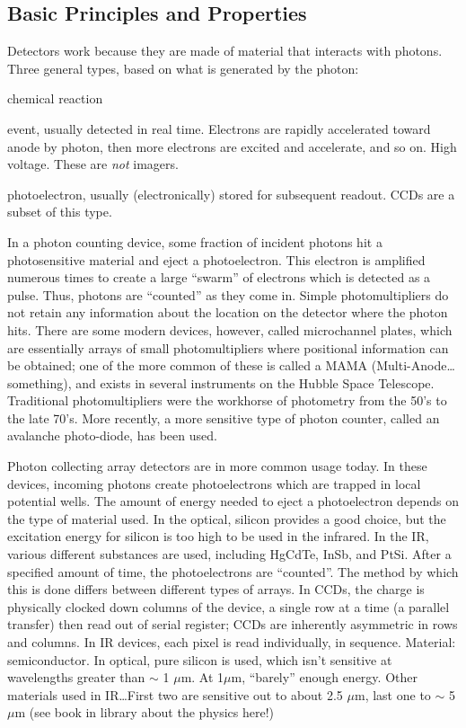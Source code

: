\documentclass[12pt]{article}
\begin{document}
\subsection{Basic Principles and Properties}
Detectors work because they are made of material that interacts with photons.
Three general types, based on what is generated by the photon:
\begin{description}[labelwidth=10em, leftmargin=12em]
    \item [Photographic detector] chemical reaction
    \item [Photomultiplier/photon counter] event, usually detected
        in real time. Electrons are rapidly accelerated toward anode
        by photon, then more electrons are excited and accelerate, and
        so on. High voltage. These are \emph{not} imagers.
    \item [Photon collecter] photoelectron, usually (electronically)
        stored for subsequent readout. CCDs are a subset of this type.
\end{description}

In a photon counting device, some fraction of incident photons hit a
photosensitive material and eject a photoelectron. This electron is
amplified numerous times to create a large ``swarm'' of electrons
which is detected as a pulse. Thus, photons are ``counted'' as they
come in. Simple photomultipliers do not retain any information about
the location on the detector where the photon hits. There are some
modern devices, however, called microchannel plates, which are
essentially arrays of small photomultipliers where positional
information can be obtained; one of the more common of these is called
a MAMA (Multi-Anode\ldots something),
and exists in several instruments on the Hubble Space
Telescope. Traditional photomultipliers were the workhorse of
photometry from the 50's to the late 70's. More recently, a more
sensitive type of photon counter, called an avalanche photo-diode, has
been used.

Photon collecting array detectors are in more common usage today. In
these devices, incoming photons create photoelectrons which are
trapped in local potential wells. The amount of energy needed to eject
a photoelectron depends on the type of material used. In the optical,
silicon provides a good choice, but the excitation energy for silicon
is too high to be used in the infrared. In the IR, various different
substances are used, including HgCdTe, InSb, and PtSi. After a
specified amount of time, the photoelectrons are ``counted''. The
method by which this is done differs between different types of
arrays. In CCDs, the charge is physically clocked down columns of the
device, a single row at a time (a parallel transfer) then read out of
serial register; CCDs are inherently asymmetric in rows and columns.
In IR devices, each pixel is read individually, in sequence.
\textcolor{myBlue}{Material: semiconductor. In optical, pure silicon
is used, which isn't sensitive at wavelengths greater than $\sim$
1 $\mu$m. At 1$\mu$m, ``barely'' enough energy. Other materials used
in IR\ldots First two are sensitive out to about 2.5 $\mu$m, last one
to $\sim$ 5 $\mu$m (see book in library about the physics here!)}
\end{document}
